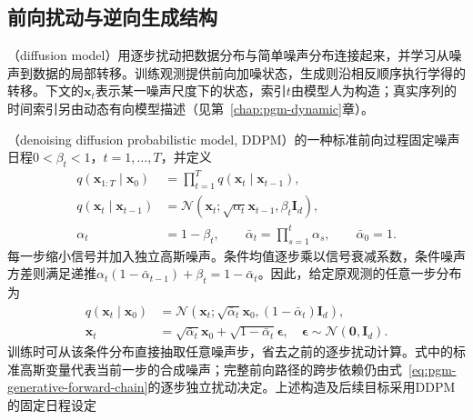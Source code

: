 \subsection{前向扰动与逆向生成结构}

\label{sec:pgm-generative-forward-reverse}

（diffusion model）用逐步扰动把数据分布与简单噪声分布连接起来，并学习从噪声到数据的局部转移。训练观测提供前向加噪状态，生成则沿相反顺序执行学得的转移。下文的$\bm{x}_t$表示某一噪声尺度下的状态，索引$t$由模型人为构造；真实序列的时间索引另由动态有向模型描述（见第~\ref{chap:pgm-dynamic}章）。

（denoising diffusion probabilistic model, DDPM）的一种标准前向过程固定噪声日程$0<\beta_t<1$，$t=1,\ldots,T$，并定义
\begin{equation}
  \label{eq:pgm-generative-forward-chain}
  \begin{aligned}
    q(\bm{x}_{1:T}\mid\bm{x}_0)
      &=\prod_{t=1}^{T}q(\bm{x}_t\mid\bm{x}_{t-1}),\\
    q(\bm{x}_t\mid\bm{x}_{t-1})
      &=\mathcal{N}(\bm{x}_t;
          \sqrt{\alpha_t}\bm{x}_{t-1},\beta_t\bm{I}_d),\\
    \alpha_t&=1-\beta_t,\qquad
    \bar{\alpha}_t=\prod_{s=1}^{t}\alpha_s,\qquad
    \bar{\alpha}_0=1.
  \end{aligned}
\end{equation}
每一步缩小信号并加入独立高斯噪声。条件均值逐步乘以信号衰减系数，条件噪声方差则满足递推$\alpha_t(1-\bar{\alpha}_{t-1})+\beta_t=1-\bar{\alpha}_t$。因此，给定原观测的任意一步分布为
\begin{equation}
  \label{eq:pgm-generative-forward-marginal}
  \begin{aligned}
    q(\bm{x}_t\mid\bm{x}_0)
      &=\mathcal{N}(\bm{x}_t;
          \sqrt{\bar{\alpha}_t}\bm{x}_0,
          (1-\bar{\alpha}_t)\bm{I}_d),\\
    \bm{x}_t&=\sqrt{\bar{\alpha}_t}\bm{x}_0+
              \sqrt{1-\bar{\alpha}_t}\bm{\epsilon},
    \quad \bm{\epsilon}\sim\mathcal{N}(\bm{0},\bm{I}_d).
  \end{aligned}
\end{equation}
训练时可从该条件分布直接抽取任意噪声步，省去之前的逐步扰动计算。式中的标准高斯变量代表当前一步的合成噪声；完整前向路径的跨步依赖仍由式~\eqref{eq:pgm-generative-forward-chain}的逐步独立扰动决定。上述构造及后续目标采用DDPM的固定日程设定

